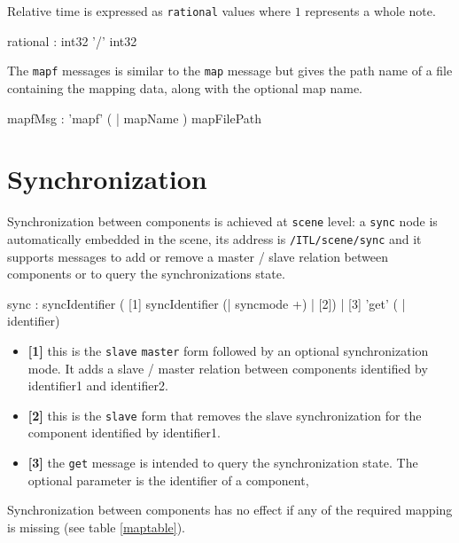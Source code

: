 \documentclass[a4paper,twoside]{report}
\newcommand{\toplevel}[1]	{\chapter{#1}}
\newcommand{\OSC}[1]		{\texttt{#1}}
\begin{document}
Relative time is expressed as \OSC{rational} values where $1$ represents a whole note.

\begin{rail}
rational : int32 '/' int32
\end{rail}

The \OSC{mapf} messages is similar to the \OSC{map} message but gives the path name of a file containing the mapping data, along with the optional map name.
\begin{rail}
mapfMsg : 'mapf' ( | mapName ) mapFilePath
\end{rail}



%


\toplevel{Synchronization}
\label{syncmsg}

Synchronization between components is achieved at \OSC{scene} level: a \OSC{sync} node is automatically embedded in the scene, its address is \OSC{/ITL/scene/sync} and it supports messages to add or remove a master / slave relation between components or to query the synchronizations state.
\begin{rail}
sync : syncIdentifier 
	 ( [1] syncIdentifier (| syncmode +) 
	   | [2])
	   | [3] 'get' ( | identifier)
\end{rail}


\begin{itemize}
\item \textbf{[1]} this is the \OSC{slave} \OSC{master} form followed by an optional synchronization mode. It adds a slave / master relation between components identified by identifier1 and identifier2. \\
\item \textbf{[2]} this is the \OSC{slave} form that removes the slave synchronization for the component identified by identifier1.
\item \textbf{[3]} the \OSC{get} message is intended to query the synchronization state. The optional parameter is the identifier of a component,
\end{itemize}
Synchronization between components has no effect if any of the required mapping is missing (see table \ref{maptable}).
\end{document}
